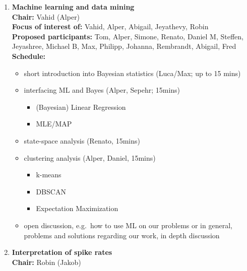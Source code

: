 \documentclass[10pt, a4paper,twoside,american]{article}
\begin{document}
\begin{enumerate}[resume]
\item {\large\bf Machine learning and data mining}\\[1ex]
  {\bf Chair:} Vahid (Alper)\\[1ex]
  {\bf Focus of interest of:} Vahid, Alper, Abigail, Jeyathevy, Robin\\[1ex]
  {\bf Proposed participants:} Tom, Alper, Simone, Renato, Daniel M, Steffen, Jeyashree, Michael B, Max, Philipp, Johanna, Rembrandt, Abigail, Fred\\[1ex]
  {\bf Schedule:}
  \begin{itemize}
  \item short introduction into Bayesian statistics (Luca/Max; up to 15 mins)
  \item interfacing ML and Bayes (Alper, Sepehr; 15mins)
    \begin{itemize}
    \item (Bayesian) Linear Regression
    \item MLE/MAP 
    \end{itemize}
  \item state-space analysis (Renato, 15mins) 
  \item clustering analysis (Alper, Daniel, 15mins)
    \begin{itemize}
    \item k-means
    \item DBSCAN
    \item Expectation Maximization
    \end{itemize}
  \item open discussion, e.g.~how to use ML on our problems or in general, problems and solutions regarding our work, in depth discussion
  \end{itemize}
\item {\large\bf Interpretation of spike rates}\\[1ex]
  {\bf Chair:} Robin (Jakob)\\[1ex]

\end{enumerate}
\end{document}
